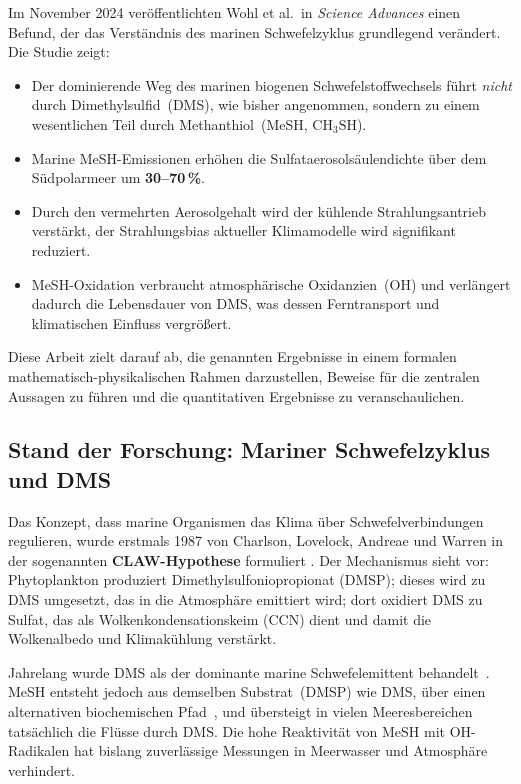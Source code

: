 ﻿\documentclass[a4paper,12pt]{article}
\theoremstyle{definition}
\begin{document}
Im November 2024 veröffentlichten Wohl et al.\ in \textit{Science Advances} einen Befund, der das
Verständnis des marinen Schwefelzyklus grundlegend verändert. Die Studie zeigt:

\begin{itemize}
  \item Der dominierende Weg des marinen biogenen Schwefelstoffwechsels führt \emph{nicht} durch
        Dimethylsulfid~(DMS), wie bisher angenommen, sondern zu einem wesentlichen Teil durch
        Methanthiol~(MeSH, \(\mathrm{CH_3SH}\)).
  \item Marine MeSH-Emissionen erhöhen die Sulfataerosolsäulendichte über dem Südpolarmeer um
        \textbf{30--70\,\%}.
  \item Durch den vermehrten Aerosolgehalt wird der kühlende Strahlungsantrieb verstärkt, der
        Strahlungsbias aktueller Klimamodelle wird signifikant reduziert.
  \item MeSH-Oxidation verbraucht atmosphärische Oxidanzien~(OH) und verlängert dadurch die
        Lebensdauer von DMS, was dessen Ferntransport und klimatischen Einfluss vergrößert.
\end{itemize}

Diese Arbeit zielt darauf ab, die genannten Ergebnisse in einem formalen mathematisch-physikalischen
Rahmen darzustellen, Beweise für die zentralen Aussagen zu führen und die quantitativen Ergebnisse
zu veranschaulichen.

\subsection{Stand der Forschung: Mariner Schwefelzyklus und DMS}

Das Konzept, dass marine Organismen das Klima über Schwefelverbindungen regulieren, wurde erstmals
1987 von Charlson, Lovelock, Andreae und Warren in der sogenannten \textbf{CLAW-Hypothese} formuliert
\cite{charlson1987}. Der Mechanismus sieht vor: Phytoplankton produziert Dimethylsulfoniopropionat
(DMSP); dieses wird zu DMS umgesetzt, das in die Atmosphäre emittiert wird; dort oxidiert DMS zu
Sulfat, das als Wolkenkondensationskeim (CCN) dient und damit die Wolkenalbedo und Klimakühlung
verstärkt.

Jahrelang wurde DMS als der dominante marine Schwefelemittent behandelt~\cite{lana2011,
andreae2019}. MeSH entsteht jedoch aus demselben Substrat~(DMSP) wie DMS, über einen alternativen
biochemischen Pfad~\cite{kiene1996}, und übersteigt in vielen Meeresbereichen tatsächlich die
Flüsse durch DMS. Die hohe Reaktivität von MeSH mit OH-Radikalen hat bislang zuverlässige
Messungen in Meerwasser und Atmosphäre verhindert.
\end{document}
